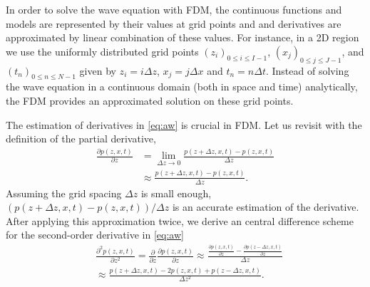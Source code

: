 \documentclass[11pt,titlepage]{article}
\theoremstyle{plain}
\theoremstyle{definition}
\theoremstyle{remark}
\numberwithin{equation}{section}
\begin{document}
In order to solve the wave equation with FDM, the continuous functions and models are represented by their values at grid points and and derivatives are approximated by linear combination of these values. For instance, in a 2D region we use the uniformly distributed grid points $(z_i)_{0\le i \le I-1 }$, $(x_j)_{0\le j \le J-1}$, and $(t_n)_{0\le n \le N-1}$ given by $z_i = i\Delta z$, $x_j = j\Delta x$ and $t_n=n\Delta t$. Instead of solving the wave equation in a continuous domain (both in space and time) analytically, the FDM provides an approximated solution on these grid points.  

The estimation of derivatives in \eqref{eq:aw} is crucial in FDM. Let us revisit with the definition of the partial derivative, 
 \begin{equation}
  \begin{aligned}
  \frac{\partial p(z, x, t)}{\partial z} &= \lim\limits_{\Delta z \rightarrow 0} \frac{p(z+\Delta z, x, t) - p(z, x, t)}{\Delta z}\\
  &\approx \frac{p(z+\Delta z, x, t) - p(z, x, t)}{\Delta z}.
  \end{aligned}
  \end{equation}
Assuming the grid spacing $\Delta z$ is small enough, $(p(z+\Delta z, x, t) - p(z, x, t))/\Delta z$ is an accurate estimation of the derivative. After applying this approximation twice, we derive an central difference scheme for the second-order derivative in \eqref{eq:aw}
  \begin{equation}
  \begin{aligned}
  &\frac{\partial^2 p(z, x, t)}{\partial z^2} = \frac{\partial}{\partial z}\frac{\partial p(z, x, t)}{\partial z} \approx \frac{\frac{\partial p(z, x, t)}{\partial z} - \frac{\partial p(z-\Delta z, x, t)}{\partial z}}{\Delta z}\\
  &\approx \frac{p(z+\Delta z, x, t) - 2p(z, x, t) + p(z-\Delta z, x, t)}{\Delta z^2}.
  \end{aligned}
  \end{equation}
  
\end{document}
